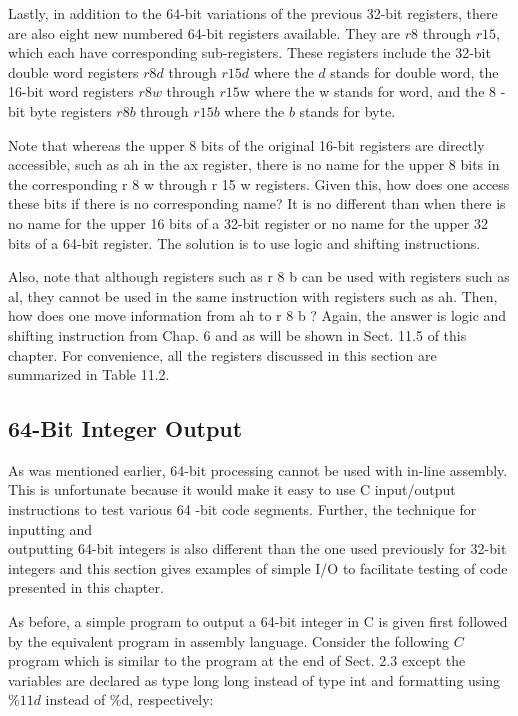 \documentclass[10pt]{book}
\begin{document}
Lastly, in addition to the 64-bit variations of the previous 32-bit registers, there are also eight new numbered 64-bit registers available. They are $r 8$ through $r 15$, which each have corresponding sub-registers. These registers include the 32-bit double word registers $r 8 d$ through $r 15 d$ where the $d$ stands for double word, the 16-bit word registers $r 8 w$ through $r 15 \mathrm{w}$ where the w stands for word, and the 8 -bit byte registers $r 8 b$ through $r 15 b$ where the $b$ stands for byte.

Note that whereas the upper 8 bits of the original 16-bit registers are directly accessible, such as ah in the ax register, there is no name for the upper 8 bits in the corresponding r 8 w through r 15 w registers. Given this, how does one access these bits if there is no corresponding name? It is no different than when there is no name for the upper 16 bits of a 32-bit register or no name for the upper 32 bits of a 64-bit register. The solution is to use logic and shifting instructions.

Also, note that although registers such as r 8 b can be used with registers such as al, they cannot be used in the same instruction with registers such as ah. Then, how does one move information from ah to r 8 b ? Again, the answer is logic and shifting instruction from Chap. 6 and as will be shown in Sect. 11.5 of this chapter. For convenience, all the registers discussed in this section are summarized in Table 11.2.

\subsection{64-Bit Integer Output}
As was mentioned earlier, 64-bit processing cannot be used with in-line assembly. This is unfortunate because it would make it easy to use C input/output instructions to test various 64 -bit code segments. Further, the technique for inputting and\\
outputting 64-bit integers is also different than the one used previously for 32-bit integers and this section gives examples of simple I/O to facilitate testing of code presented in this chapter.

As before, a simple program to output a 64-bit integer in C is given first followed by the equivalent program in assembly language. Consider the following $C$ program which is similar to the program at the end of Sect. 2.3 except the variables are declared as type long long instead of type int and formatting using $\% 11 d$ instead of \%d, respectively:
\end{document}
